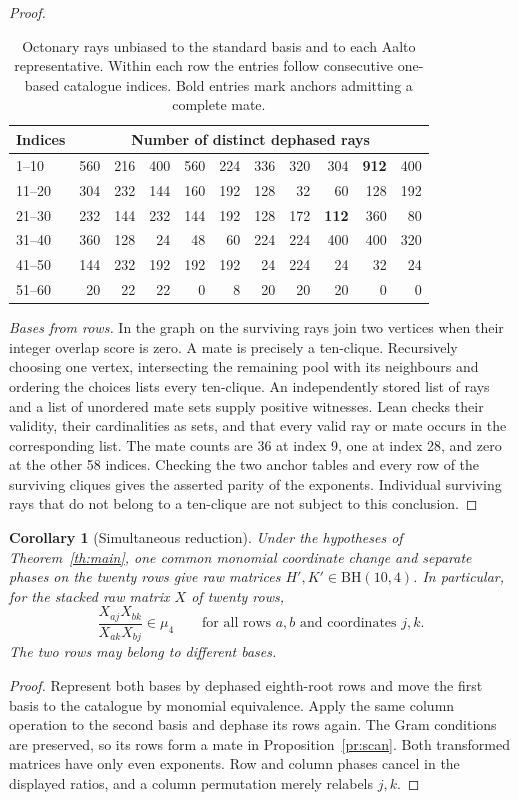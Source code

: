 \documentclass[11pt]{article}
\newtheorem{corollary}[theorem]{Corollary}
\newcommand{\BH}{\mathrm{BH}}
\begin{document}
\begin{proof}
\begin{table}[tb]
\centering
\caption{Octonary rays unbiased to the standard basis and to each
Aalto representative. Within each row the entries follow consecutive
one-based catalogue indices. Bold entries mark anchors admitting a
complete mate.}\label{tab:rays}
\small
\begin{tabular}{@{}lrrrrrrrrrr@{}}
\toprule
Indices & \multicolumn{10}{c}{Number of distinct dephased rays}\\
\midrule
1--10  &560&216&400&560&224&336&320&304&\textbf{912}&400\\
11--20 &304&232&144&160&192&128&32&60&128&192\\
21--30 &232&144&232&144&192&128&172&\textbf{112}&360&80\\
31--40 &360&128&24&48&60&224&224&400&400&320\\
41--50 &144&232&192&192&192&24&224&24&32&24\\
51--60 &20&22&22&0&8&20&20&20&0&0\\
\bottomrule
\end{tabular}
\end{table}

\emph{Bases from rows.}
In the graph on the surviving rays join two vertices when their
integer overlap score is zero. A mate is precisely a ten-clique.
Recursively choosing one vertex, intersecting the remaining pool with
its neighbours and ordering the choices lists every ten-clique.
An independently stored list of rays and a list of unordered mate
sets supply positive witnesses. Lean checks their validity, their
cardinalities as sets, and that every valid ray or mate occurs in
the corresponding list. The mate counts are 36 at index 9, one at
index 28, and zero at the other 58 indices. Checking the two anchor
tables and every row of the surviving cliques gives the asserted
parity of the exponents. Individual surviving rays that do not belong
to a ten-clique are not subject to this conclusion.
\end{proof}

\begin{corollary}[Simultaneous reduction]\label{co:descent}
Under the hypotheses of Theorem~\ref{th:main}, one common monomial
coordinate change and separate phases on the twenty rows give raw
matrices \(H',K'\in\BH(10,4)\). In particular, for the stacked raw
matrix \(X\) of twenty rows,
\[
                  \frac{X_{aj}X_{bk}}{X_{ak}X_{bj}}\in\mu_4
           \qquad\text{for all rows \(a,b\) and coordinates \(j,k\)} .
\]
The two rows may belong to different bases.
\end{corollary}
\begin{proof}
Represent both bases by dephased eighth-root rows and move the first
basis to the catalogue by monomial equivalence. Apply the same column
operation to the second basis and dephase its rows again. The Gram
conditions are preserved, so its rows form a mate in
Proposition~\ref{pr:scan}. Both transformed matrices have only even
exponents. Row and column phases cancel in the displayed ratios, and a
column permutation merely relabels \(j,k\).
\end{proof}
\end{document}
